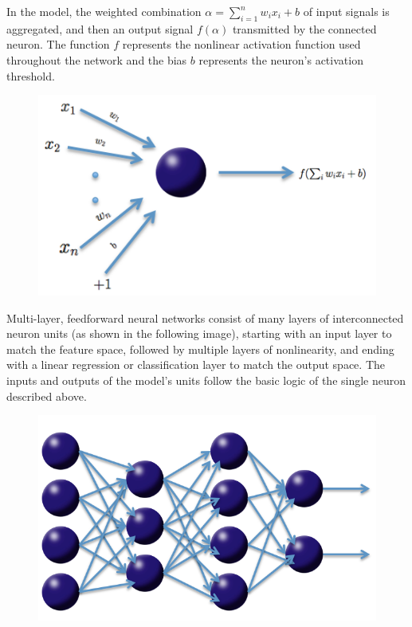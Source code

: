 In the model, the weighted combination $\alpha = \sum_{i=1}^{n} w_i x_i + b$ of input signals is aggregated, and then an output signal $f(\alpha)$ transmitted by the connected neuron. The function $f$ represents the nonlinear activation function used throughout the network and the bias $b$ represents the neuron's activation threshold.

\begin{figure}[h]
\centering
\includegraphics[scale=0.7]{neuron.png}
\end{figure}

Multi-layer, feedforward neural networks consist of many layers of interconnected neuron units (as shown in the following image), starting with an input layer to match the feature space, followed by multiple layers of nonlinearity, and ending with a linear regression or classification layer to match the output space. The inputs and outputs of the model's units follow the basic logic of the single neuron described above. 

\begin{figure}[ht]
\centering
\includegraphics[scale=0.5]{net.png}
\end{figure}

